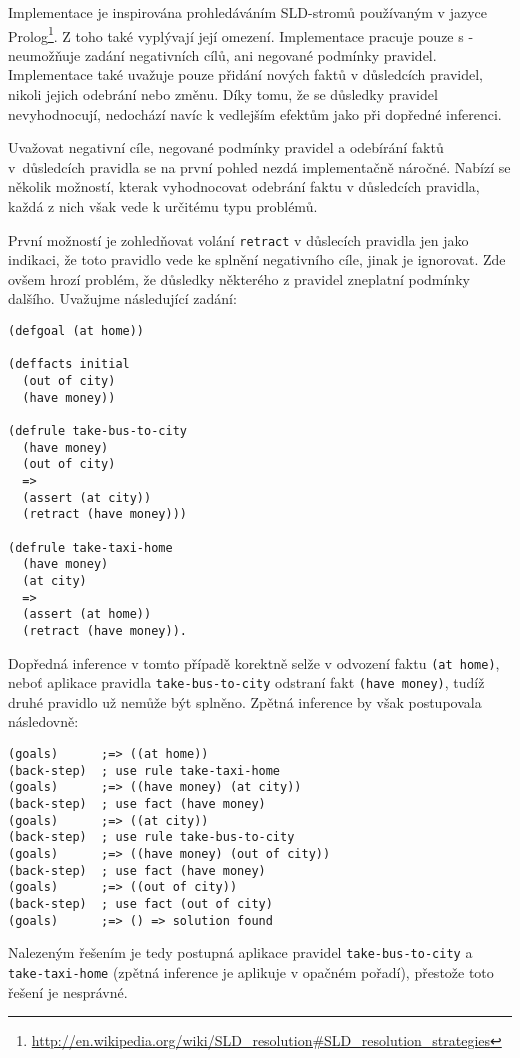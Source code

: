 Implementace je inspirována prohledáváním SLD-stromů používaným v jazyce
Prolog\footnote{\url{http://en.wikipedia.org/wiki/SLD\_resolution\#SLD\_resolution\_strategies}}.
Z toho také vyplývají její omezení. Implementace pracuje pouze s  - neumožňuje zadání negativních cílů, ani negované podmínky pravidel.
Implementace také uvažuje pouze přidání nových faktů v důsledcích pravidel,
nikoli jejich odebrání nebo změnu. Díky tomu, že se důsledky pravidel
nevyhodnocují, nedochází navíc k vedlejším efektům jako při dopředné inferenci.

Uvažovat negativní cíle, negované podmínky pravidel a odebírání faktů
v~důsledcích pravidla se na první pohled nezdá implementačně náročné. Nabízí se
několik možností, kterak vyhodnocovat odebrání faktu v důsledcích pravidla,
každá z nich však vede k určitému typu problémů.

První možností je zohledňovat volání \verb|retract| v důslecích pravidla jen
jako indikaci, že toto pravidlo vede ke splnění negativního cíle, jinak je
ignorovat. Zde ovšem hrozí problém, že důsledky některého z pravidel zneplatní
podmínky dalšího. Uvažujme následující zadání:
\begin{verbatim}
(defgoal (at home))

(deffacts initial
  (out of city)
  (have money))

(defrule take-bus-to-city
  (have money)
  (out of city)
  =>
  (assert (at city))
  (retract (have money)))

(defrule take-taxi-home
  (have money)
  (at city)
  =>
  (assert (at home))
  (retract (have money)).
\end{verbatim}
Dopředná inference v tomto případě korektně selže v odvození faktu
\verb|(at home)|, neboť aplikace pravidla \verb|take-bus-to-city| odstraní fakt
\verb|(have money)|, tudíž druhé pravidlo už nemůže být splněno. Zpětná
inference by však postupovala následovně:
\begin{verbatim}
(goals)      ;=> ((at home))
(back-step)  ; use rule take-taxi-home
(goals)      ;=> ((have money) (at city))
(back-step)  ; use fact (have money)
(goals)      ;=> ((at city))
(back-step)  ; use rule take-bus-to-city
(goals)      ;=> ((have money) (out of city))
(back-step)  ; use fact (have money)
(goals)      ;=> ((out of city))
(back-step)  ; use fact (out of city)
(goals)      ;=> () => solution found
\end{verbatim}
Nalezeným řešením je tedy postupná aplikace pravidel \verb|take-bus-to-city| a
\verb|take-taxi-home| (zpětná inference je aplikuje v opačném pořadí), přestože
toto řešení je nesprávné.

